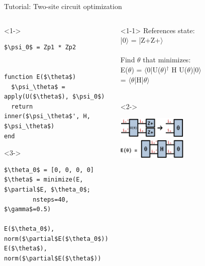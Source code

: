 \begin{frame}[fragile]{Tutorial: Two-site circuit optimization}

\begin{columns}

\begin{column}{5cm}

\begin{onlyenv}<1->
\begin{lstlisting}[language=JuliaLocal, style=julia, mathescape, basicstyle=\small]
$\psi_0$ = Zp1 * Zp2


function E($\theta$)
  $\psi_\theta$ = apply(U($\theta$), $\psi_0$)
  return inner($\psi_\theta$', H, $\psi_\theta$)
end
\end{lstlisting}
\end{onlyenv}

\begin{onlyenv}<3->
\begin{lstlisting}[language=JuliaLocal, style=julia, mathescape, basicstyle=\small]
$\theta_0$ = [0, 0, 0, 0]
$\theta$ = minimize(E, $\partial$E, $\theta_0$;
        nsteps=40, $\gamma$=0.5)

E($\theta_0$), norm($\partial$E($\theta_0$))
E($\theta$), norm($\partial$E($\theta$))
 \end{lstlisting}
\end{onlyenv}

\end{column}

\begin{column}{5cm}

\begin{onlyenv}<1-1>
References state: \\
|0$\rangle$ = |Z+Z+$\rangle$ \\
~\\
Find $\theta$ that minimizes: \\
E($\theta$) = $\langle$0|U($\theta$)$^\dagger$ H U($\theta$)|0$\rangle$ \\
       = $\langle\theta$|H|$\theta\rangle$ \\
~\\
\end{onlyenv}

\begin{onlyenv}<2->
\vspace*{0.0cm}
\begin{center}
\includegraphics[width=0.2\textwidth]{
  slides/assets/UZp1Zp2.png
} \\
\includegraphics[width=0.2\textwidth]{
  slides/assets/theta12Htheta12.png
}
\end{center}
\vspace*{0.0cm}
\end{onlyenv}


\end{column}
\end{columns}
\end{frame}
